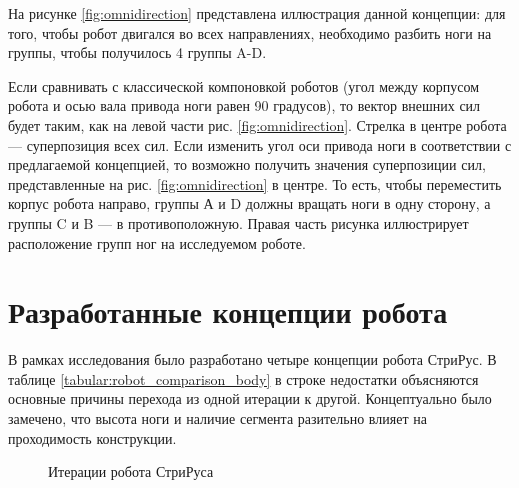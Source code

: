 На рисунке \ref{fig:omnidirection} представлена иллюстрация данной концепции: для того, чтобы робот двигался во всех направлениях, необходимо разбить ноги на группы, чтобы получилось 4 группы A-D.

Если сравнивать с классической компоновкой роботов (угол между корпусом робота и осью вала привода ноги равен 90 градусов), то вектор внешних сил будет таким, как на левой части рис. \ref{fig:omnidirection}. Стрелка в центре робота — суперпозиция всех сил. Если изменить угол оси привода ноги в соответствии с предлагаемой концепцией, то возможно получить значения суперпозиции сил, представленные на рис. \ref{fig:omnidirection} в центре. То есть, чтобы переместить корпус робота направо, группы А и D должны вращать ноги в одну сторону, а группы C и B — в противоположную. Правая часть рисунка иллюстрирует расположение групп ног на исследуемом роботе. 

\section{Разработанные концепции робота}

В рамках исследования было разработано четыре концепции робота СтриРус. В таблице \ref{tabular:robot_comparison_body} в строке недостатки объясняются основные причины перехода из одной итерации к другой. Концептуально было замечено, что высота ноги и наличие сегмента разительно влияет на проходимость конструкции. \quad {}

\begin{figure}[H]
    \caption{Итерации робота СтриРуса}\label{fig:striruses}
  \end{figure}

